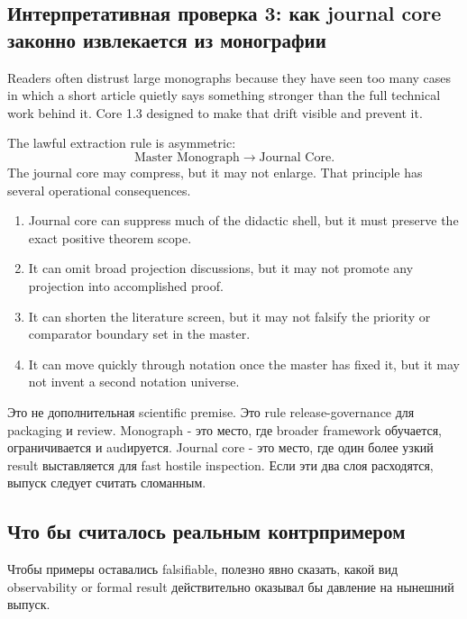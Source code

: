 \subsection{Интерпретативная проверка 3: как journal core законно извлекается из монографии}

Readers often distrust large monographs because they have seen too many cases
in which a short article quietly says something stronger than the full
technical work behind it. Core 1.3 designed to make that drift visible and
prevent it.

The lawful extraction rule is asymmetric:
\[
\text{Master Monograph} \longrightarrow \text{Journal Core}.
\]
The journal core may compress, but it may not enlarge. That principle has
several operational consequences.

\begin{enumerate}
\item Journal core can suppress much of the didactic shell, but it must
      preserve the exact positive theorem scope.
\item It can omit broad projection discussions, but it may not promote any
      projection into accomplished proof.
\item It can shorten the literature screen, but it may not falsify the
      priority or comparator boundary set in the master.
\item It can move quickly through notation once the master has fixed it, but
      it may not invent a second notation universe.
\end{enumerate}

Это не дополнительная scientific premise. Это rule release-governance для
packaging и review. Monograph - это место, где broader framework обучается,
ограничивается и audируется. Journal core - это место, где один более узкий
result выставляется для fast hostile inspection. Если эти два слоя расходятся,
выпуск следует считать сломанным.

\subsection{Что бы считалось реальным контрпримером}

Чтобы примеры оставались falsifiable, полезно явно сказать, какой вид
observability or formal result действительно оказывал бы давление на
нынешний выпуск.

